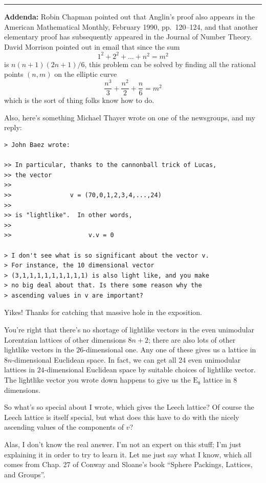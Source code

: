 \documentclass{article}
\begin{document}
\begin{center}\rule{0.5\linewidth}{0.5pt}\end{center}

\textbf{Addenda:} Robin Chapman pointed out that Anglin's proof also
appears in the American Mathematical Monthly, February 1990,
pp.~120--124, and that another elementary proof has subsequently
appeared in the Journal of Number Theory. David Morrison pointed out in
email that since the sum \[1^2 + 2^2 + \ldots + n^2 = m^2\] is
\(n(n+1)(2n+1)/6\), this problem can be solved by finding all the
rational points \((n,m)\) on the elliptic curve
\[\frac{n^3}{3} + \frac{n^2}2 + \frac{n}{6} = m^2\] which is the sort of
thing folks know how to do.

Also, here's something Michael Thayer wrote on one of the newsgroups,
and my reply:

\begin{verbatim}
> John Baez wrote:

>> In particular, thanks to the cannonball trick of Lucas,
>> the vector
>>
>>                v = (70,0,1,2,3,4,...,24)
>>
>> is "lightlike".  In other words,
>>
>>                     v.v = 0

> I don't see what is so significant about the vector v.
> For instance, the 10 dimensional vector
> (3,1,1,1,1,1,1,1,1,1) is also light like, and you make
> no big deal about that. Is there some reason why the
> ascending values in v are important?
\end{verbatim}

Yikes! Thanks for catching that massive hole in the exposition.

You're right that there's no shortage of lightlike vectors in the even
unimodular Lorentzian lattices of other dimensions \(8n+2\); there are
also lots of other lightlike vectors in the \(26\)-dimensional one. Any
one of these gives us a lattice in \(8n\)-dimensional Euclidean space.
In fact, we can get all 24 even unimodular lattices in
\(24\)-dimensional Euclidean space by suitable choices of lightlike
vector. The lightlike vector you wrote down happens to give us the
\(\mathrm{E}_8\) lattice in 8 dimensions.

So what's so special about I wrote, which gives the Leech lattice? Of
course the Leech lattice is itself special, but what does this have to
do with the nicely ascending values of the components of \(v\)?

Alas, I don't know the real answer. I'm not an expert on this stuff; I'm
just explaining it in order to try to learn it. Let me just say what I
know, which all comes from Chap. 27 of Conway and Sloane's book ``Sphere
Packings, Lattices, and Groups''.
\end{document}
